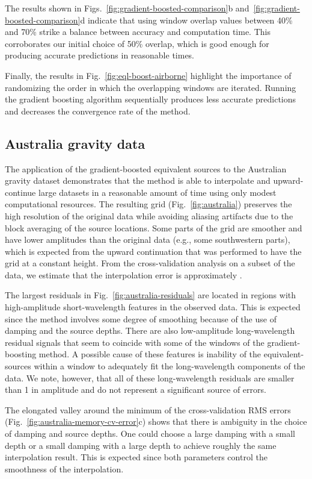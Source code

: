 The results shown in Figs.~\ref{fig:gradient-boosted-comparison}b
and~\ref{fig:gradient-boosted-comparison}d indicate that using
window overlap values between 40\% and 70\% strike a balance between
accuracy and computation time.
This corroborates our initial choice of 50\% overlap, which is good enough for
producing accurate predictions in reasonable times.

Finally, the results in Fig.~\ref{fig:eql-boost-airborne} highlight the
importance of randomizing the order in which the overlapping windows are
iterated.
Running the gradient boosting algorithm sequentially produces less accurate
predictions and decreases the convergence rate of the method.

\subsection{Australia gravity data}

The application of the gradient-boosted equivalent sources to the Australian
gravity dataset demonstrates that the method is able to interpolate and
upward-continue large datasets in a reasonable amount of time using only modest
computational resources.
The resulting grid (Fig.~\ref{fig:australia}) preserves the high resolution of
the original data while avoiding aliasing artifacts due to the block averaging
of the source locations.
Some parts of the grid are smoother and have lower amplitudes than the original
data (e.g., some southwestern parts), which is expected from the upward
continuation that was performed to have the grid at a constant height.
From the cross-validation analysis on a subset of the data, we estimate that
the interpolation error is approximately \AustraliaEqlRmsScore{}.

The largest residuals in Fig.~\ref{fig:australia-residuals} are located in
regions with high-amplitude short-wavelength features in the observed data.
This is expected since the method involves some degree of smoothing because of
the use of damping and the source depths.
There are also low-amplitude long-wavelength residual signals that seem to
coincide with some of the windows of the gradient-boosting method.
A possible cause of these features is inability of the equivalent-sources
within a window to adequately fit the long-wavelength components of the data.
We note, however, that all of these long-wavelength residuals are smaller than
1\mGal{} in amplitude and do not represent a significant source of errors.

The elongated valley around the minimum of the cross-validation RMS errors
(Fig.~\ref{fig:australia-memory-cv-error}c) shows that there is ambiguity in
the choice of damping and source depths.
One could choose a large damping with a small depth or a small damping with a
large depth to achieve roughly the same interpolation result.
This is expected since both parameters control the smoothness of the
interpolation.

